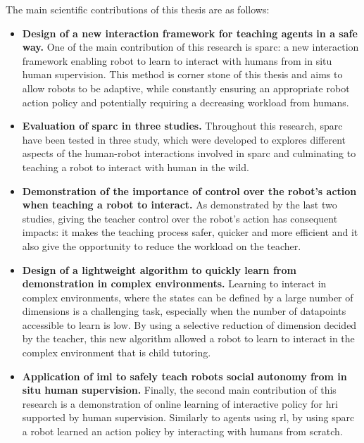 The main scientific contributions of this thesis are as follows:
\begin{itemize}
	\item \textbf{Design of a new interaction framework for teaching agents in a safe way.} One of the main contribution of this research is \gls{sparc}: a new interaction framework enabling robot to learn to interact with humans from in situ human supervision. This method is corner stone of this thesis and aims to allow robots to be adaptive, while constantly ensuring an appropriate robot action policy and potentially requiring a decreasing workload from humans.
	
	\item \textbf{Evaluation of \gls{sparc} in three studies.} Throughout this research, \gls{sparc} have been tested in three study, which were developed to explores different aspects of the human-robot interactions involved in \gls{sparc} and culminating to teaching a robot to interact with human in the wild.
	
	\item \textbf{Demonstration of the importance of control over the robot's action when teaching a robot to interact.} As demonstrated by the last two studies, giving the teacher control over the robot's action has consequent impacts: it makes the teaching process safer, quicker and more efficient and it also give the opportunity to reduce the workload on the teacher.
	
	\item \textbf{Design of a lightweight algorithm to quickly learn from demonstration in complex environments.} Learning to interact in complex environments, where the states can be defined by a large number of dimensions is a challenging task, especially when the number of datapoints accessible to learn is low. By using a selective reduction of dimension decided by the teacher, this new algorithm allowed a robot to learn to interact in the complex environment that is child tutoring. 
	
	\item \textbf{Application of \gls{iml} to safely teach robots social autonomy from in situ human supervision.} Finally, the second main contribution of this research is a demonstration of online learning of interactive policy for \gls{hri} supported by human supervision. Similarly to agents using \gls{rl}, by using \gls{sparc} a robot learned an action policy by interacting with humans from scratch.
	
\end{itemize}

